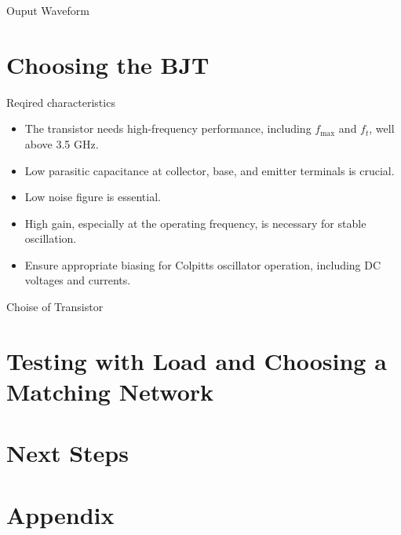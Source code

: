 \documentclass{beamer}
\begin{document}
\begin{frame}{Ouput Waveform}


\end{frame}




\section{Choosing the BJT}
\begin{frame}{Reqired characteristics}
  \begin{itemize}
    \item <1-> The transistor needs high-frequency performance, including \(f_{\text{max}}\) and \(f_t\), well above 3.5 GHz.
    \item <2-> Low parasitic capacitance at collector, base, and emitter terminals is crucial.
    \item <3-> Low noise figure is essential.
    \item <4-> High gain, especially at the operating frequency, is necessary for stable oscillation.
    \item <5-> Ensure appropriate biasing for Colpitts oscillator operation, including DC voltages and currents.
  \end{itemize}
\end{frame}

\begin{frame}{Choise of Transistor}
  
\end{frame}




\section{Testing with Load and Choosing a Matching Network}



\section{Next Steps}

\section*{Appendix}
\end{document}

